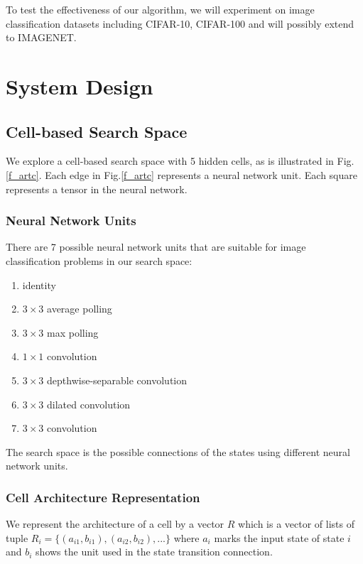 \documentclass[conference]{IEEEtran}
\begin{document}
  To test the effectiveness of our algorithm, we will experiment on image classification datasets including CIFAR-10, CIFAR-100 and will possibly extend to IMAGENET.


\section{System Design}
\subsection{Cell-based Search Space}

We explore a cell-based search space with 5 hidden cells, as is illustrated in Fig.\ref{f_artc}. Each edge in Fig.\ref{f_artc} represents a neural network unit. Each square represents a tensor in the neural network.

\subsubsection{Neural Network Units}

There are 7 possible neural network units that are suitable for image classification problems in our search space:

    \begin{enumerate}
      \item identity
      \item $3\times3$ average polling
      \item $3\times3$ max polling
      \item $1\times1$ convolution
      \item $3\times3$ depthwise-separable convolution
      \item $3\times3$ dilated convolution
      \item $3\times3$ convolution
    \end{enumerate}

The search space is the possible connections of the states using different neural network units.

\subsubsection{Cell Architecture Representation}

We represent the architecture of a cell by a vector $R$ which is a vector of lists of tuple $R_{i} = \{(a_{i1}, b_{i1}), (a_{i2}, b_{i2}), ...\}$ where $a_i$ marks the input state of state $i$ and $b_i$ shows the unit used in the state transition connection.
\end{document}
